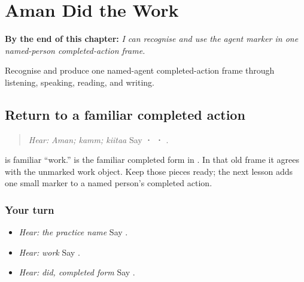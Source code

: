 
\chapter{Aman Did the Work}
\label{ch:pa-a2-ne}

\begin{chapteropening}
\textbf{By the end of this chapter:} \emph{I can recognise and use the agent marker in one named-person completed-action frame.}

Recognise and produce one named-agent completed-action frame through listening, speaking, reading, and writing.
\end{chapteropening}

\section[\texorpdfstring{\pa{ਅਮਨ} · \pa{ਕੰਮ} · \pa{ਕੀਤਾ} (Aman; kamm; kiitaa)}{ਅਮਨ · ਕੰਮ · ਕੀਤਾ (Aman; kamm; kiitaa)}]{Return to a familiar completed action}

\label{lesson:PA-C210-perfective-return}



\begin{quote}
\emph{Hear:} \emph{Aman; kamm; kiitaa} Say \textbf{ ·  · }.
\end{quote}

\begin{grammarlens}[title={Grammar Lens}]
\textbf{} is familiar “work.” \textbf{} is the familiar completed form in \textbf{  }. In that old frame it agrees with the unmarked work object. Keep those pieces ready; the next lesson adds one small marker to a named person's completed action.
\end{grammarlens}

\subsection*{Your turn}
\begin{itemize}
\raggedright
  \item \emph{Hear:} \emph{the practice name} Say \textbf{}.
  \item \emph{Hear:} \emph{work} Say \textbf{}.
  \item \emph{Hear:} \emph{did, completed form} Say \textbf{}.
\end{itemize}

